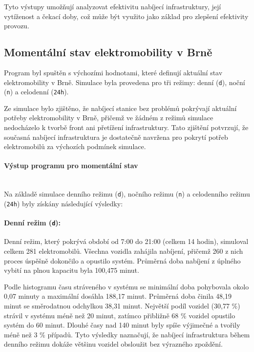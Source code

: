 \documentclass[a4paper,11pt]{article}
\begin{document}
Tyto výstupy umožňují analyzovat efektivitu nabíjecí infrastruktury, její vytíženost a čekací doby, což může být využito jako základ pro zlepšení efektivity provozu.

\subsection{Momentální stav elektromobility v Brně}
Program byl spuštěn s výchozími hodnotami, které definují aktuální stav elektromobility v Brně. Simulace byla provedena pro tři režimy: denní (\texttt{d}), noční (\texttt{n}) a celodenní (\texttt{24h}). 

Ze simulace bylo zjištěno, že nabíjecí stanice bez problémů pokrývají aktuální potřeby elektromobility v Brně, přičemž ve žádném z režimů simulace nedocházelo k tvorbě front ani přetížení infrastruktury. Tato zjištění potvrzují, že současná nabíjecí infrastruktura je dostatečně navržena pro pokrytí potřeb elektromobilů za výchozích podmínek simulace.

\paragraph{Výstup programu pro momentální stav\\\\}

Na základě simulace denního režimu (\texttt{d}), nočního režimu (\texttt{n}) a celodenního režimu (\texttt{24h}) byly získány následující výsledky:

\paragraph{Denní režim (\texttt{d}):} 
Denní režim, který pokrývá období od 7:00 do 21:00 (celkem 14 hodin), simuloval celkem 281 elektromobilů. Všechna vozidla zahájila nabíjení, přičemž 260 z nich proces úspěšně dokončilo a opustilo systém. Průměrná doba nabíjení z úplného vybití na plnou kapacitu byla 100,475 minut.

Podle histogramu času stráveného v systému se minimální doba pohybovala okolo 0,07 minuty a maximální dosáhla 188,17 minut. Průměrná doba činila 48,19 minut se směrodatnou odchylkou 38,31 minut. Největší podíl vozidel (30,77 \%) strávil v systému méně než 20 minut, zatímco přibližně 68 \% vozidel opustilo systém do 60 minut. Dlouhé časy nad 140 minut byly spíše výjimečné a tvořily méně než 3 \% případů. Tyto výsledky naznačují, že nabíjecí infrastruktura během denního režimu dokáže většinu vozidel obsloužit bez výrazného zpoždění.
\end{document}
